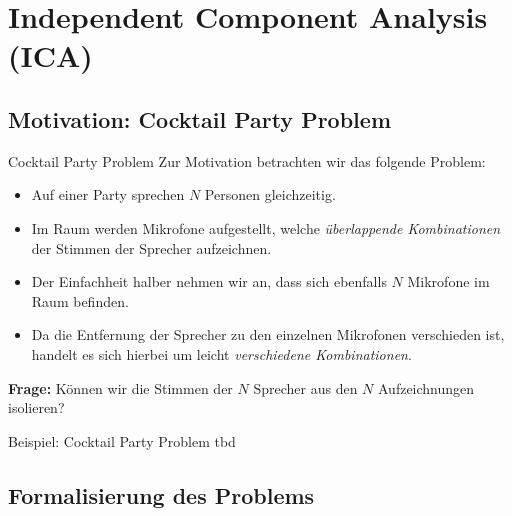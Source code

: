 \section{Independent Component Analysis (ICA)}

\divider

\subsection{Motivation: Cocktail Party Problem}

\begin{frame}{Cocktail Party Problem}{}
	Zur Motivation betrachten wir das folgende Problem:
	
	\begin{itemize}
		\item Auf einer Party sprechen $N$ Personen gleichzeitig.
		\item Im Raum werden Mikrofone aufgestellt, welche \textit{überlappende Kombinationen}
			der Stimmen der Sprecher aufzeichnen.
		\item Der Einfachheit halber nehmen wir an, dass sich ebenfalls $N$ Mikrofone im Raum befinden.
		\item Da die Entfernung der Sprecher zu den einzelnen Mikrofonen verschieden ist, handelt es sich hierbei um leicht
			\textit{verschiedene Kombinationen}.
	\end{itemize}
	
	\begin{boxGray}
		\begin{center}
			\textbf{Frage:} Können wir die Stimmen der $N$ Sprecher aus den $N$ Aufzeichnungen isolieren?
		\end{center}
	\end{boxGray}
\end{frame}


\begin{frame}{Beispiel: Cocktail Party Problem}{}
	tbd
\end{frame}


\subsection{Formalisierung des Problems}

